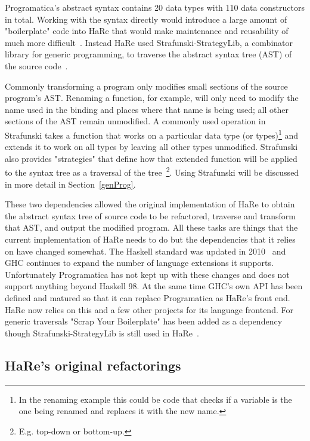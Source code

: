 Programatica's abstract syntax contains 20 data types with 110 data constructors in total. Working with the syntax directly would introduce a large amount of "boilerplate" code into HaRe that would make maintenance and reusability of much more difficult~\citep{huiqingThesis}. Instead HaRe used Strafunski-StrategyLib, a combinator library for generic programming, to traverse the abstract syntax tree (AST) of the source code~\citep{strafunski}. 

Commonly transforming a program only modifies small sections of the source program's AST. Renaming a function, for example, will only need to modify the name used in the binding and places where that name is being used; all other sections of the AST remain unmodified. A commonly used operation in Strafunski takes a function that works on a particular data type (or types)\footnote{In the renaming example this could be code that checks if a variable is the one being renamed and replaces it with the new name.} and extends it to work on all types by leaving all other types unmodified. Strafunski also provides "strategies" that define how that extended function will be applied to the syntax tree as a traversal of the tree~\citep{strafunski}\footnote{E.g. top-down or bottom-up.}. Using Strafunski will be discussed in more detail in Section~\ref{genProg}.

These two dependencies allowed the original implementation of HaRe to obtain the abstract syntax tree of source code to be refactored, traverse and transform that AST, and output the modified program. All these tasks are things that the current implementation of HaRe needs to do but the dependencies that it relies on have changed somewhat. The Haskell standard was updated in 2010~\citep{haskell2010} and GHC continues to expand the number of language extensions it supports. Unfortunately Programatica has not kept up with these changes and does not support anything beyond Haskell 98. At the same time GHC's own API has been defined and matured so that it can replace Programatica as HaRe's front end. HaRe now relies on this and a few other projects for its language frontend. For generic traversals "Scrap Your Boilerplate" has been added as a dependency though Strafunski-StrategyLib is still used in HaRe~\citep{syb}.
 
\subsection{HaRe's original refactorings}\label{origRefactorings}

